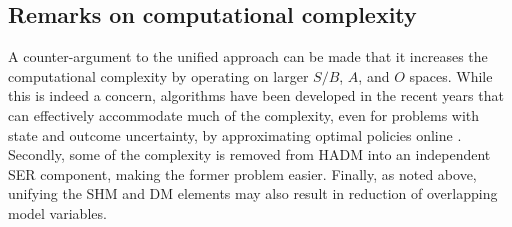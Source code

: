 \subsection{Remarks on computational complexity}

A counter-argument to the unified approach can be made that it increases the computational complexity by operating on larger $S/B$, $A$, and $O$ spaces. While this is indeed a concern, algorithms have been developed in the recent years that can effectively accommodate much of the complexity, even for problems with state and outcome uncertainty, by approximating optimal policies online \cite{Silver2010,Browne2012}. Secondly, some of the complexity is removed from HADM into an independent SER component, making the former problem easier. Finally, as noted above, unifying the SHM and DM elements may also result in reduction of overlapping model variables.
